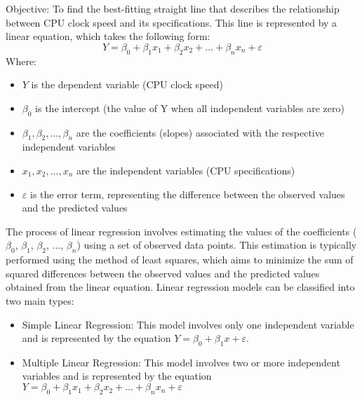 Objective: To find the best-fitting straight line that describes the relationship between CPU clock speed and its specifications. This line is represented by a linear equation, which takes the following form:\\
$$ Y = \beta_0 + \beta_1x_1 + \beta_2x_2 + ... + \beta_nx_n + \varepsilon  $$
Where:
\begin{itemize}
    \item $Y$ is the dependent variable (CPU clock speed)
    \item $ \beta_0 $ is the intercept (the value of Y when all independent variables are zero)
    \item $ \beta_1,  \beta_2, ...,  \beta_n$ are the coefficients (slopes) associated with the respective independent variables
    \item $x_1, x_2, ..., x_n$ are the independent variables (CPU specifications)
    \item $\varepsilon$ is the error term, representing the difference between the observed values and the predicted values
\end{itemize}

The process of linear regression involves estimating the values of the coefficients ($\beta_0$, $\beta_1$, $\beta_2$, ..., $\beta_n$) using a set of observed data points. This estimation is typically performed using the method of least squares, which aims to minimize the sum of squared differences between the observed values and the predicted values obtained from the linear equation.
Linear regression models can be classified into two main types:

\begin{itemize}
    \item Simple Linear Regression: This model involves only one independent variable and is represented by the equation $ Y = \beta_0 + \beta_1x + \varepsilon  $.
    \item Multiple Linear Regression: This model involves two or more independent variables and is represented by the equation $ Y = \beta_0 + \beta_1x_1 + \beta_2x_2 + ... + \beta_nx_n + \varepsilon  $
\end{itemize}

